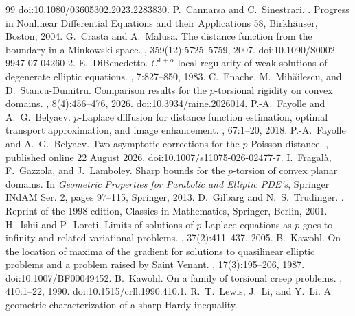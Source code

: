 \documentclass[11pt]{article}
\theoremstyle{definition}
\theoremstyle{remark}
\begin{document}
\begin{thebibliography}{99}
\newblock doi:10.1080/03605302.2023.2283830.
 P.\ Cannarsa and C.\ Sinestrari.
.
\newblock Progress in Nonlinear Differential Equations and their Applications 58, Birkh\"auser, Boston, 2004.
 G.\ Crasta and A.\ Malusa.
\newblock The distance function from the boundary in a Minkowski space.
, 359(12):5725--5759, 2007.
\newblock doi:10.1090/S0002-9947-07-04260-2.
 E.\ DiBenedetto.
\newblock $C^{1+\alpha}$ local regularity of weak solutions of degenerate elliptic equations.
, 7:827--850, 1983.
 C.\ Enache, M.\ Mih\u{a}ilescu, and D.\ Stancu-Dumitru.
\newblock Comparison results for the $p$-torsional rigidity on convex domains.
, 8(4):456--476, 2026.
\newblock doi:10.3934/mine.2026014.
 P.-A.\ Fayolle and A.\ G.\ Belyaev.
\newblock $p$-Laplace diffusion for distance function estimation, optimal transport approximation, and image enhancement.
, 67:1--20, 2018.
 P.-A.\ Fayolle and A.\ G.\ Belyaev.
\newblock Two asymptotic corrections for the $p$-Poisson distance.
, published online 22 August 2026.
\newblock doi:10.1007/s11075-026-02477-7.
 I.\ Fragal\`a, F.\ Gazzola, and J.\ Lamboley.
\newblock Sharp bounds for the $p$-torsion of convex planar domains.
\newblock In {\em Geometric Properties for Parabolic and Elliptic PDE's},
Springer INdAM Ser. 2, pages 97--115, Springer, 2013.
 D.\ Gilbarg and N.\ S.\ Trudinger.
.
\newblock Reprint of the 1998 edition, Classics in Mathematics, Springer, Berlin, 2001.
 H.\ Ishii and P.\ Loreti.
\newblock Limits of solutions of $p$-Laplace equations as $p$ goes to infinity and related variational problems.
, 37(2):411--437, 2005.
 B.\ Kawohl.
\newblock On the location of maxima of the gradient for solutions to quasilinear elliptic problems and a problem raised by Saint Venant.
, 17(3):195--206, 1987.
\newblock doi:10.1007/BF00049452.
 B.\ Kawohl.
\newblock On a family of torsional creep problems.
, 410:1--22, 1990.
\newblock doi:10.1515/crll.1990.410.1.
 R.\ T.\ Lewis, J.\ Li, and Y.\ Li.
\newblock A geometric characterization of a sharp Hardy inequality.

\end{thebibliography}
\end{document}
